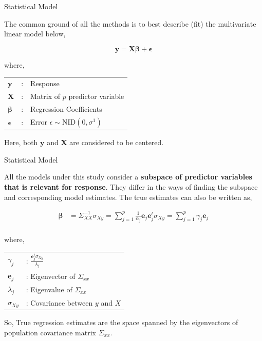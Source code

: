 \documentclass[ignorenonframetext,]{beamer}
\begin{document}
\begin{frame}{Statistical Model}

The common ground of all the methods is to best describe (fit) the
multivariate linear model below,

\begin{equation}
\boldsymbol{y} = \boldsymbol{X}\boldsymbol{\beta} + \boldsymbol{\epsilon}
\label{eq:model}
\end{equation}

where,

\begin{longtable}[]{@{}lll@{}}
\toprule
\(\boldsymbol{y}\) & : & Response\tabularnewline
\(\boldsymbol{X}\) & : & Matrix of \(p\) predictor
variable\tabularnewline
\(\boldsymbol{\beta}\) & : & Regression Coefficients\tabularnewline
\(\boldsymbol{\epsilon}\) & : & Error
\(\epsilon \sim \text{NID}(0, \sigma^1)\)\tabularnewline
\bottomrule
\end{longtable}

Here, both \(\boldsymbol{y}\) and \(\boldsymbol{X}\) are considered to
be centered.

\end{frame}

\begin{frame}{Statistical Model}

All the models under this study consider a \textbf{subspace of predictor
variables that is relevant for response}. They differ in the ways of
finding the subspace and corresponding model estimates. The true
estimates can also be written as,

\[
\begin{aligned}
\boldsymbol{\beta} &= \Sigma_{XX}^{-1}\sigma_{Xy} = \sum_{j=1}^p \frac{1}{\alpha_j}\boldsymbol{e}_j\boldsymbol{e}_j^t\sigma_{Xy}
= \sum_{j=1}^p\gamma_j\boldsymbol{e}_j\\
\end{aligned}
\]

where,

\begin{longtable}[]{@{}ll@{}}
\toprule
\(\gamma_j\) & :
\(\frac{\boldsymbol{e}_j^t\sigma_{Xy}}{\lambda_j}\)\tabularnewline
\(\boldsymbol{e}_j\) & : Eigenvector of \(\Sigma_{xx}\)\tabularnewline
\(\lambda_j\) & : Eigenvalue of \(\Sigma_{xx}\)\tabularnewline
\(\sigma_{Xy}\) & : Covariance between \(y\) and \(X\)\tabularnewline
\bottomrule
\end{longtable}

So, True regression estimates are the space spanned by the eigenvectors
of population covariance matrix \(\Sigma_{xx}\).

\end{frame}
\end{document}
